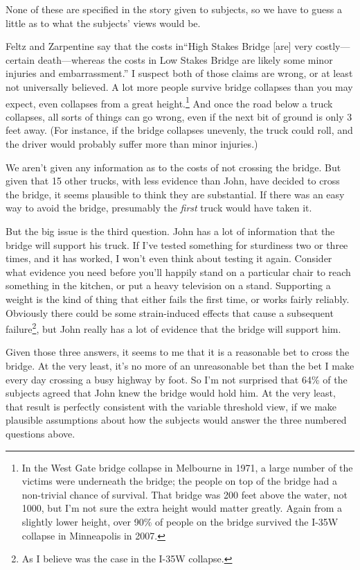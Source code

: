 None of these are specified in the story given to subjects, so we have to guess a little as to what the subjects' views would be. 

Feltz and Zarpentine say that the costs in``High Stakes Bridge [are] very costly---certain death---whereas the costs in Low Stakes Bridge are likely some minor injuries and embarrassment.'' \cite[??]{FeltzZarpentine2010} I suspect both of those claims are wrong, or at least not universally believed. A lot more people survive bridge collapses than you may expect, even collapses from a great height.\footnote{In the West Gate bridge collapse in Melbourne in 1971, a large number of the victims were underneath the bridge; the people on top of the bridge had a non-trivial chance of survival. That bridge was 200 feet above the water, not 1000, but I'm not sure the extra height would matter greatly. Again from a slightly lower height, over 90\% of people on the bridge survived the I-35W collapse in Minneapolis in 2007.} And once the road below a truck collapses, all sorts of things can go wrong, even if the next bit of ground is only 3 feet away. (For instance, if the bridge collapses unevenly, the truck could roll, and the driver would probably suffer more than minor injuries.)

We aren't given any information as to the costs of not crossing the bridge. But given that 15 other trucks, with less evidence than John, have decided to cross the bridge, it seems plausible to think they are substantial. If there was an easy way to avoid the bridge, presumably the \textit{first} truck would have taken it.

But the big issue is the third question. John has a lot of information that the bridge will support his truck. If I've tested something for sturdiness two or three times, and it has worked, I won't even think about testing it again. Consider what evidence you need before you'll happily stand on a particular chair to reach something in the kitchen, or put a heavy television on a stand. Supporting a weight is the kind of thing that either fails the first time, or works fairly reliably. Obviously there could be some strain-induced effects that cause a subsequent failure\footnote{As I believe was the case in the I-35W collapse.}, but John really has a lot of evidence that the bridge will support him.

Given those three answers, it seems to me that it is a reasonable bet to cross the bridge. At the very least, it's no more of an unreasonable bet than the bet I make every day crossing a busy highway by foot. So I'm not surprised that 64\% of the subjects agreed that John knew the bridge would hold him. At the very least, that result is perfectly consistent with the variable threshold view, if we make plausible assumptions about how the subjects would answer the three numbered questions above.

